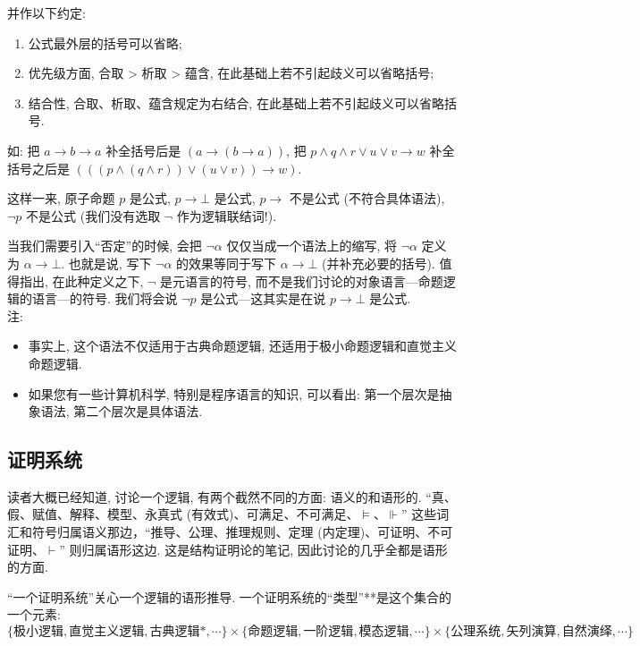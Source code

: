 \documentclass{article}
\def\a{\alpha}
\begin{document}
并作以下约定: 
\begin{enumerate}
\item 公式最外层的括号可以省略;
\item 优先级方面, 合取 > 析取 > 蕴含, 在此基础上若不引起歧义可以省略括号;
\item 结合性, 合取、析取、蕴含规定为右结合, 在此基础上若不引起歧义可以省略括号.
\end{enumerate}
如: 把 $a \to b \to a$ 补全括号后是 $(a \to (b \to a))$, 把 
$p \land q \land r \lor u \lor v \to w$ 补全括号之后是 
$(((p \land (q \land r)) \lor (u \lor v)) \to w)$.

这样一来, 原子命题 $p$ 是公式, $p \to \bot$ 是公式, $p \to$ 不是公式 (不符合具体语法), $\neg p$ 不是公式 (我们没有选取 $\neg$ 作为逻辑联结词!).

当我们需要引入``否定''的时候, 会把 $\neg \a$ 仅仅当成一个语法上的缩写, 将 $\neg \a$ 定义为 $\a \to \bot$. 也就是说, 写下 $\neg \a$ 的效果等同于写下 $\a \to \bot$ (并补充必要的括号). 值得指出, 在此种定义之下, $\neg$ 是元语言的符号, 而不是我们讨论的对象语言---命题逻辑的语言---的符号. 我们将会说 $\neg p$ 是公式---这其实是在说 $p \to \bot$ 是公式.\\

注: 
\begin{itemize}
	\item 事实上, 这个语法不仅适用于古典命题逻辑, 还适用于极小命题逻辑和直觉主义命题逻辑.
	\item 如果您有一些计算机科学, 特别是程序语言的知识, 可以看出: 第一个层次是抽象语法, 第二个层次是具体语法.
\end{itemize}


\subsection{证明系统}

读者大概已经知道, 讨论一个逻辑, 有两个截然不同的方面: 语义的和语形的. ``真、假、赋值、解释、模型、永真式 (有效式)、可满足、不可满足、$\models$、$\Vdash$'' 这些词汇和符号归属语义那边，``推导、公理、推理规则、定理 (内定理)、可证明、不可证明、$\vdash$'' 则归属语形这边. 这是结构证明论的笔记, 因此讨论的几乎全都是语形的方面.

``一个证明系统''关心一个逻辑的语形推导. 一个证明系统的``类型''**是这个集合的一个元素:
$$
\{\text{极小逻辑}, \text{直觉主义逻辑}, \text{古典逻辑*}, \cdots\} \times \{\text{命题逻辑}, \text{一阶逻辑}, \text{模态逻辑}, \cdots\} \times \{\text{公理系统}, \text{矢列演算}, \text{自然演绎}, \cdots\}
$$
\end{document}
